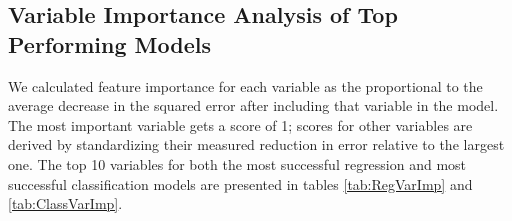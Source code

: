 \documentclass[12pt,]{article}
\begin{document}
\hypertarget{variable-importance-analysis-of-top-performing-models}{%
\subsection{Variable Importance Analysis of Top Performing
Models}\label{variable-importance-analysis-of-top-performing-models}}

We calculated feature importance for each variable as the proportional
to the average decrease in the squared error after including that
variable in the model. The most important variable gets a score of 1;
scores for other variables are derived by standardizing their measured
reduction in error relative to the largest one. The top 10 variables for
both the most successful regression and most successful classification
models are presented in tables \ref{tab:RegVarImp} and
\ref{tab:ClassVarImp}.

\begin{table}

\caption{\label{tab:Reg VarImp}\label{tab:RegVarImp} Feature Importance of Top Performing Regression Model}
\centering
{}
\end{table}
\end{document}
